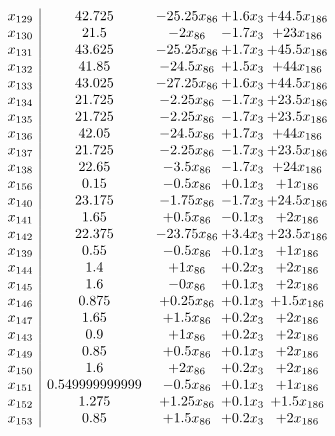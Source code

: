 \documentclass[11pt]{article}
\begin{document}
\[\begin{array}{c| c c@{\hskip 2pt} c@{\hskip 2pt} c@{\hskip 2pt} }
 x_{129}   &  42.725 & -25.25 x_{86} & + 1.6 x_{3} & + 44.5 x_{186}\\
 x_{130}   &  21.5 & -2 x_{86} & -1.7 x_{3} & + 23 x_{186}\\
 x_{131}   &  43.625 & -25.25 x_{86} & + 1.7 x_{3} & + 45.5 x_{186}\\
 x_{132}   &  41.85 & -24.5 x_{86} & + 1.5 x_{3} & + 44 x_{186}\\
 x_{133}   &  43.025 & -27.25 x_{86} & + 1.6 x_{3} & + 44.5 x_{186}\\
 x_{134}   &  21.725 & -2.25 x_{86} & -1.7 x_{3} & + 23.5 x_{186}\\
 x_{135}   &  21.725 & -2.25 x_{86} & -1.7 x_{3} & + 23.5 x_{186}\\
 x_{136}   &  42.05 & -24.5 x_{86} & + 1.7 x_{3} & + 44 x_{186}\\
 x_{137}   &  21.725 & -2.25 x_{86} & -1.7 x_{3} & + 23.5 x_{186}\\
 x_{138}   &  22.65 & -3.5 x_{86} & -1.7 x_{3} & + 24 x_{186}\\
 x_{156}   &  0.15 & -0.5 x_{86} & + 0.1 x_{3} & + 1 x_{186}\\
 x_{140}   &  23.175 & -1.75 x_{86} & -1.7 x_{3} & + 24.5 x_{186}\\
 x_{141}   &  1.65 & + 0.5 x_{86} & -0.1 x_{3} & + 2 x_{186}\\
 x_{142}   &  22.375 & -23.75 x_{86} & + 3.4 x_{3} & + 23.5 x_{186}\\
 x_{139}   &  0.55 & -0.5 x_{86} & + 0.1 x_{3} & + 1 x_{186}\\
 x_{144}   &  1.4 & + 1 x_{86} & + 0.2 x_{3} & + 2 x_{186}\\
 x_{145}   &  1.6 & -0 x_{86} & + 0.1 x_{3} & + 2 x_{186}\\
 x_{146}   &  0.875 & + 0.25 x_{86} & + 0.1 x_{3} & + 1.5 x_{186}\\
 x_{147}   &  1.65 & + 1.5 x_{86} & + 0.2 x_{3} & + 2 x_{186}\\
 x_{143}   &  0.9 & + 1 x_{86} & + 0.2 x_{3} & + 2 x_{186}\\
 x_{149}   &  0.85 & + 0.5 x_{86} & + 0.1 x_{3} & + 2 x_{186}\\
 x_{150}   &  1.6 & + 2 x_{86} & + 0.2 x_{3} & + 2 x_{186}\\
 x_{151}   &  0.549999999999 & -0.5 x_{86} & + 0.1 x_{3} & + 1 x_{186}\\
 x_{152}   &  1.275 & + 1.25 x_{86} & + 0.1 x_{3} & + 1.5 x_{186}\\
 x_{153}   &  0.85 & + 1.5 x_{86} & + 0.2 x_{3} & + 2 x_{186}\\

\end{array}\]
\end{document}
